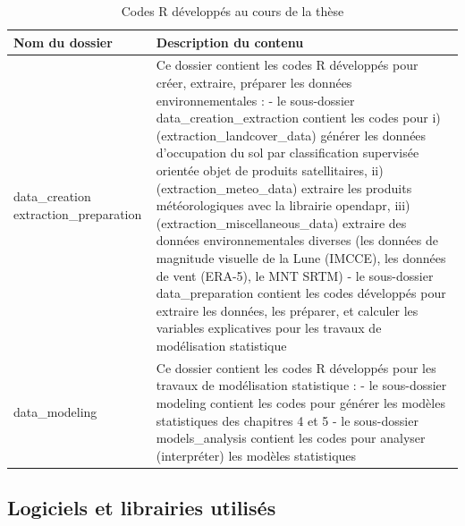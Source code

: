 \documentclass[12pt,twoside]{reedthesis}
\begin{document}
\renewcommand{\arraystretch}{2}
\begin{table}[!h]

\caption[Codes R développés au cours de la thèse]{\label{tab:scripts-developed}Codes R développés au cours de la thèse}
\centering
\fontsize{9}{11}\selectfont
\begin{tabu} to 
\toprule
Nom du dossier & Description du contenu\\
\midrule
{}  data\_creation extraction\_preparation & Ce dossier contient les codes R développés pour créer, extraire, préparer les données environnementales : \newline \newline             - le sous-dossier data\_creation\_extraction contient les codes pour i) (extraction\_landcover\_data) générer les données d'occupation du sol par classification supervisée orientée objet de produits satellitaires, ii) (extraction\_meteo\_data) extraire les produits météorologiques avec la librairie opendapr, iii) (extraction\_miscellaneous\_data) extraire des données environnementales diverses (les données de magnitude visuelle de la Lune (IMCCE), les données de vent (ERA-5), le MNT SRTM) \newline \newline             - le sous-dossier data\_preparation contient les codes développés pour extraire les données, les préparer, et calculer les variables explicatives pour les travaux de modélisation statistique\\
data\_modeling & Ce dossier contient les codes R développés pour les travaux de modélisation statistique : \newline \newline             - le sous-dossier modeling contient les codes pour générer les modèles statistiques des chapitres 4 et 5 \newline \newline             - le sous-dossier models\_analysis contient les codes pour analyser (interpréter) les modèles statistiques\\
\bottomrule
\end{tabu}
\end{table}
\renewcommand{\arraystretch}{1}

\hypertarget{software}{%
\subsection{Logiciels et librairies utilisés}\label{software}}
\end{document}

